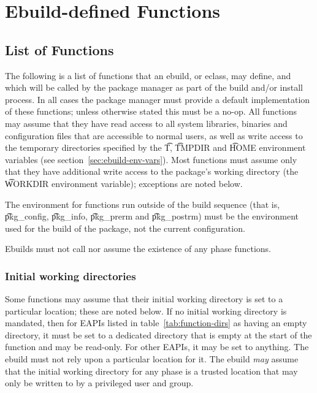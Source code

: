 \chapter{Ebuild-defined Functions}
\label{ch:ebuild-functions}

\section{List of Functions}

The following is a list of functions that an ebuild, or eclass, may define, and which will be called
by the package manager as part of the build and/or install process. In all cases the package manager
must provide a default implementation of these functions; unless otherwise stated this must be a
no-op. All functions may assume that they have read access to all system libraries, binaries and
configuration files that are accessible to normal users, as well as write access to the temporary
directories specified by the \t{T}, \t{TMPDIR} and \t{HOME} environment variables
(see section~\ref{sec:ebuild-env-vars}). Most functions must assume only that they have additional
write access to the package's working directory (the \t{WORKDIR} environment variable); exceptions
are noted below.

The environment for functions run outside of the build sequence (that is, \t{pkg_config},
\t{pkg_info}, \t{pkg_prerm} and \t{pkg_postrm}) must be the environment used for the build of the
package, not the current configuration.

Ebuilds must not call nor assume the existence of any phase functions.

\subsection{Initial working directories}
\label{sec:s-to-workdir-fallback}

 Some functions may assume that their initial working directory is
set to a particular location; these are noted below. If no initial working directory is mandated,
then for EAPIs listed in table~\ref{tab:function-dirs} as having an empty directory, it must be set
to a dedicated directory that is empty at the start of the function and may be read-only. For other
EAPIs, it may be set to anything. The ebuild must not rely upon a particular location for it.
The ebuild \emph{may} assume that the initial working directory for any phase is a trusted location
that may only be written to by a privileged user and group.

